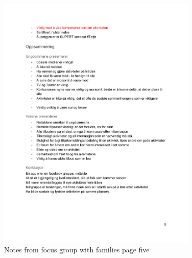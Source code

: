 \begin{figure}[H]
\centering
    \includegraphics[width=0.85\textwidth]{fig/workshop/users/WSBrukere_5.pdf}
    \caption{Notes from focus group with families page five}
    \label{Users_5}
\end{figure}


\cleardoublepage